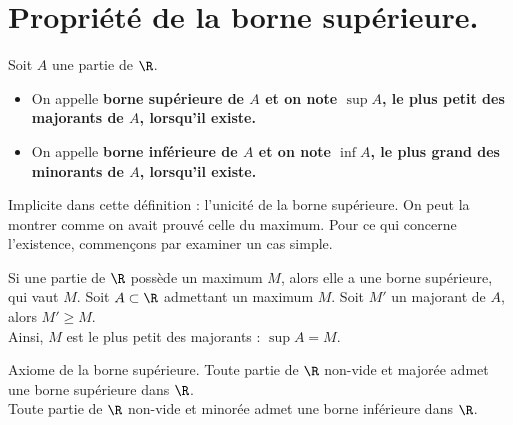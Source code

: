 \documentclass[11pt]{article}
\begin{document}


\thispagestyle{fancy}

\setcounter{section}{-1}

\section{Propriété de la borne supérieure.}

\begin{defi}{}{}
    Soit $A$ une partie de $\R$.
    \begin{itemize}
        \item On appelle \bf{borne supérieure} de $A$ et on note $\sup A$, le plus petit des majorants de $A$, lorsqu'il existe.
        \item On appelle \bf{borne inférieure} de $A$ et on note $\inf A$, le plus grand des minorants de $A$, lorsqu'il existe.
    \end{itemize}
\end{defi}

\quad Implicite dans cette définition : l'unicité de la borne supérieure. On peut la montrer comme on avait prouvé celle du maximum. Pour ce qui concerne l'existence, commençons par examiner un cas simple.

\begin{prop}{}{}
    Si une partie de $\R$ possède un maximum $M$, alors elle a une borne supérieure, qui vaut $M$.
    \tcblower
    Soit $A\subset\R$ admettant un maximum $M$. Soit $M'$ un majorant de $A$, alors $M'\geq M$.\\
    Ainsi, $M$ est le plus petit des majorants : $\sup A = M$.
\end{prop}

\begin{thm}{Axiome de la borne supérieure.}{}
    Toute partie de $\R$ non-vide et majorée admet une borne supérieure dans $\R$.\\
    Toute partie de $\R$ non-vide et minorée admet une borne inférieure dans $\R$.
\end{thm}
\end{document}
